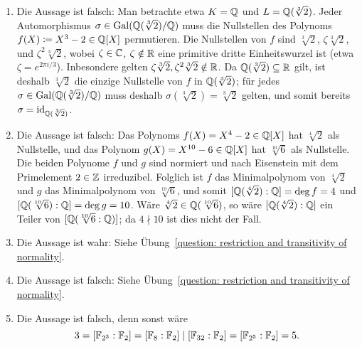 \begin{solution}
  \begin{enumerate}
    \item
      Die Aussage ist falsch:
      Man betrachte etwa $K = \mathbb{Q}$ und $L = \mathbb{Q}(\sqrt[3]{2})$.
      Jeder Automorphismus $\sigma \in \operatorname{Gal}(\mathbb{Q}(\sqrt[3]{2})/\mathbb{Q})$ muss die Nullstellen des Polynoms $f(X) \coloneqq X^3-2 \in \mathbb{Q}[X]$ permutieren.
      Die Nullstellen von $f$ sind $\sqrt[3]{2}$, $\zeta \sqrt[3]{2}$, und $\zeta^2 \sqrt[3]{2}$, wobei $\zeta \in \mathbb{C}$, $\zeta \notin \mathbb{R}$ eine primitive dritte Einheitswurzel ist (etwa $\zeta = e^{2 \pi i/3}$).
      Inbesondere gelten $\zeta \sqrt[3]{2}, \zeta^2 \sqrt[3]{2} \notin \mathbb{R}$.
      Da $\mathbb{Q}(\sqrt[3]{2}) \subseteq \mathbb{R}$ gilt, ist deshalb $\sqrt[3]{2}$ die einzige Nullstelle von $f$ in $\mathbb{Q}(\sqrt[3]{2})$;
      für jedes $\sigma \in \operatorname{Gal}(\mathbb{Q}(\sqrt[3]{2})/\mathbb{Q})$ muss deshalb $\sigma(\sqrt[3]{2}) = \sqrt[3]{2}$ gelten, und somit bereits $\sigma = \operatorname{id}_{\mathbb{Q}(\sqrt[3]{2})}$.
      
    \item
      Die Aussage ist falsch:
      Das Polynoms $f(X) = X^4 - 2 \in \mathbb{Q}[X]$ hat $\sqrt[4]{2}$ als Nullstelle, und das Polynom $g(X) = X^{10} - 6 \in \mathbb{Q}[X]$ hat $\sqrt[10]{6}$ als Nullstelle.
      Die beiden Polynome $f$ und $g$ sind normiert und nach Eisenstein mit dem Primelement $2 \in \mathbb{Z}$ irreduzibel.
      Folglich ist $f$ das Minimalpolynom von $\sqrt[4]{2}$ und $g$ das Minimalpolynom von $\sqrt[10]{6}$, und somit $[\mathbb{Q}(\sqrt[4]{2}) : \mathbb{Q}] = \deg f = 4$ und $[\mathbb{Q}(\sqrt[10]{6}) : \mathbb{Q}] = \deg g = 10$.
      Wäre $\sqrt[4]{2} \in \mathbb{Q}(\sqrt[10]{6})$, so wäre $[\mathbb{Q}(\sqrt[4]{2}) : \mathbb{Q}]$ ein Teiler von $[\mathbb{Q}(\sqrt[10]{6} : \mathbb{Q})]$; da $4 \nmid 10$ ist dies nicht der Fall.
      
    \item
      Die Aussage ist wahr:
      Siehe Übung~\ref{question: restriction and transitivity of normality}.
      
    \item
      Die Aussage ist falsch:
      Siehe Übung~\ref{question: restriction and transitivity of normality}.
      
    \item
      Die Aussage ist falsch, denn sonst wäre
      \[
              3
        =     [\mathbb{F}_{2^3} : \mathbb{F}_2]
        =     [\mathbb{F}_8 : \mathbb{F}_2]
        \mid  [\mathbb{F}_{32} : \mathbb{F}_2]
        =     [\mathbb{F}_{2^5} : \mathbb{F}_2]
        =     5.
      \]
      

\end{enumerate}
\end{solution}
